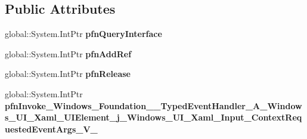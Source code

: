 \subsection*{Public Attributes}
\begin{DoxyCompactItemize}
\item 
\mbox{\label{struct_windows_1_1_foundation_1_1_typed_event_handler___a___windows___u_i___xaml___u_i_element__da1bc19a586bc8852d547ddd669460cf_a0f11a28ebd5e8886d8a65ec6f51f2e49}} 
global\+::\+System.\+Int\+Ptr {\bfseries pfn\+Query\+Interface}
\item 
\mbox{\label{struct_windows_1_1_foundation_1_1_typed_event_handler___a___windows___u_i___xaml___u_i_element__da1bc19a586bc8852d547ddd669460cf_abef7d1bb1d6ed7b55c45f0cfec949cce}} 
global\+::\+System.\+Int\+Ptr {\bfseries pfn\+Add\+Ref}
\item 
\mbox{\label{struct_windows_1_1_foundation_1_1_typed_event_handler___a___windows___u_i___xaml___u_i_element__da1bc19a586bc8852d547ddd669460cf_ad5fc960c13d1cb171308f5c3ad080234}} 
global\+::\+System.\+Int\+Ptr {\bfseries pfn\+Release}
\item 
\mbox{\label{struct_windows_1_1_foundation_1_1_typed_event_handler___a___windows___u_i___xaml___u_i_element__da1bc19a586bc8852d547ddd669460cf_a621fd6b14e6213b30a57d16f74750850}} 
global\+::\+System.\+Int\+Ptr {\bfseries pfn\+Invoke\+\_\+\+Windows\+\_\+\+Foundation\+\_\+\+\_\+\+Typed\+Event\+Handler\+\_\+\+A\+\_\+\+Windows\+\_\+\+U\+I\+\_\+\+Xaml\+\_\+\+U\+I\+Element\+\_\+j\+\_\+\+Windows\+\_\+\+U\+I\+\_\+\+Xaml\+\_\+\+Input\+\_\+\+Context\+Requested\+Event\+Args\+\_\+\+V\+\_\+}
\end{DoxyCompactItemize}
